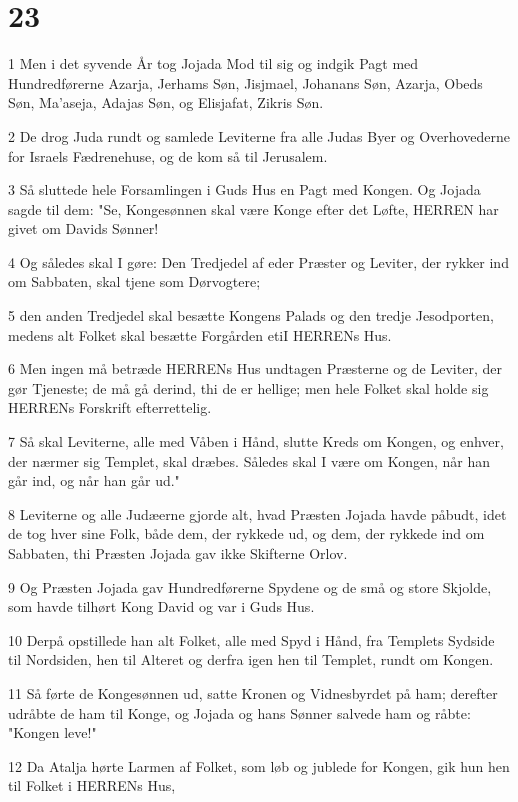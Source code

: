 \chapter{23}

\par 1 Men i det syvende År tog Jojada Mod til sig og indgik Pagt med Hundredførerne Azarja, Jerhams Søn, Jisjmael, Johanans Søn, Azarja, Obeds Søn, Ma'aseja, Adajas Søn, og Elisjafat, Zikris Søn.
\par 2 De drog Juda rundt og samlede Leviterne fra alle Judas Byer og Overhovederne for Israels Fædrenehuse, og de kom så til Jerusalem.
\par 3 Så sluttede hele Forsamlingen i Guds Hus en Pagt med Kongen. Og Jojada sagde til dem: "Se, Kongesønnen skal være Konge efter det Løfte, HERREN har givet om Davids Sønner!
\par 4 Og således skal I gøre: Den Tredjedel af eder Præster og Leviter, der rykker ind om Sabbaten, skal tjene som Dørvogtere;
\par 5 den anden Tredjedel skal besætte Kongens Palads og den tredje Jesodporten, medens alt Folket skal besætte Forgården etiI HERRENs Hus.
\par 6 Men ingen må betræde HERRENs Hus undtagen Præsterne og de Leviter, der gør Tjeneste; de må gå derind, thi de er hellige; men hele Folket skal holde sig HERRENs Forskrift efterrettelig.
\par 7 Så skal Leviterne, alle med Våben i Hånd, slutte Kreds om Kongen, og enhver, der nærmer sig Templet, skal dræbes. Således skal I være om Kongen, når han går ind, og når han går ud."
\par 8 Leviterne og alle Judæerne gjorde alt, hvad Præsten Jojada havde påbudt, idet de tog hver sine Folk, både dem, der rykkede ud, og dem, der rykkede ind om Sabbaten, thi Præsten Jojada gav ikke Skifterne Orlov.
\par 9 Og Præsten Jojada gav Hundredførerne Spydene og de små og store Skjolde, som havde tilhørt Kong David og var i Guds Hus.
\par 10 Derpå opstillede han alt Folket, alle med Spyd i Hånd, fra Templets Sydside til Nordsiden, hen til Alteret og derfra igen hen til Templet, rundt om Kongen.
\par 11 Så førte de Kongesønnen ud, satte Kronen og Vidnesbyrdet på ham; derefter udråbte de ham til Konge, og Jojada og hans Sønner salvede ham og råbte: "Kongen leve!"
\par 12 Da Atalja hørte Larmen af Folket, som løb og jublede for Kongen, gik hun hen til Folket i HERRENs Hus,
